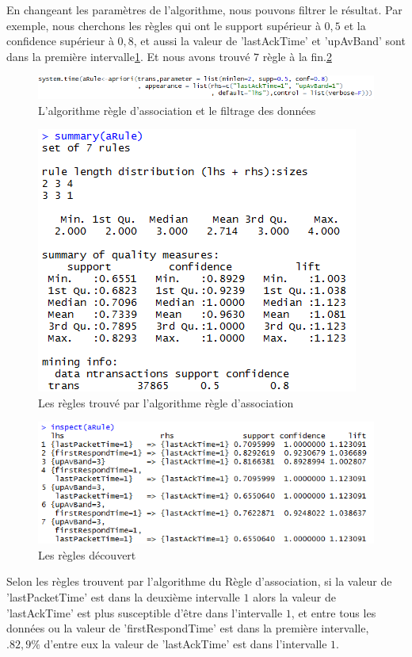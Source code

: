 En changeant les paramètres de l'algorithme, nous pouvons filtrer le résultat. Par exemple, nous cherchons les règles qui ont le support supérieur à
$0,5$ et la confidence supérieur à $0,8$, et aussi la valeur de 'lastAckTime' et 'upAvBand' sont dans la première intervalle\ref{fig:arp}. Et nous avons trouvé $7$ règle à la fin.\ref{fig:newar}

\begin{figure}[H]
\centering
\includegraphics[width=1.2\linewidth]{images/arp}
\caption{L'algorithme règle d'association et le filtrage des données  }
\label{fig:arp}
\end{figure}


\begin{figure}[H]
\centering
\includegraphics[width=0.5\linewidth]{images/ars}
\caption{Les règles trouvé par l'algorithme règle d'association  }
\label{fig:newar}
\end{figure}

\begin{figure}[H]
\centering
\includegraphics[width=0.8\linewidth]{images/AR2}
\caption{Les règles découvert}
\label{fig:AR2}
\end{figure}

Selon les règles trouvent par l'algorithme du Règle d'association, si la valeur de 'lastPacketTime' est dans la deuxième intervalle $1$ alors la valeur de 'lastAckTime' est plus susceptible d'être dans l'intervalle $1$, et entre tous les données ou la valeur de 'firstRespondTime' est dans la première intervalle, $.82,9\%$ d'entre eux la valeur de 'lastAckTime' est dans l'intervalle $1$.


